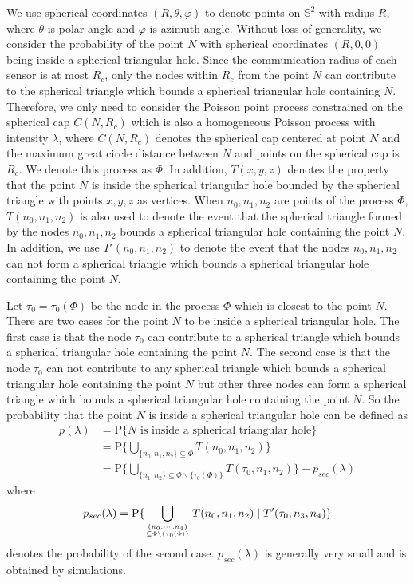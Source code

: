 \documentclass[journal, twoside]{IEEEtran}
\begin{document}
We use spherical coordinates $(R, \theta, \varphi)$ to denote points on $\mathbb{S}^2$ with radius $R$,
where $\theta$ is polar angle and $\varphi$ is azimuth angle. Without loss of generality, we
consider the probability of the point $N$ with spherical coordinates $(R, 0, 0)$ being inside a
spherical triangular hole. Since the communication radius of each sensor is 
at most $R_c$, only the nodes within $R_c$ from the point $N$ can
contribute to the spherical triangle which bounds a spherical triangular hole containing $N$. 
Therefore, we only need to consider the Poisson point
process constrained on the spherical cap $C(N, R_c)$ which is also a
homogeneous Poisson process with intensity $\lambda$, where $C(N, R_c)$
denotes the spherical cap centered at point $N$ and the maximum great circle
distance between $N$ and points on the spherical cap is $R_c$. We denote this
process as $\Phi$. In addition, $T(x, y, z)$ denotes the property that
the point $N$ is inside the spherical triangular hole
bounded by the spherical triangle with points $x, y, z$ as vertices. When $n_0, n_1,
n_2$ are points of the process $\Phi$, $T(n_0, n_1, n_2)$ is also used
to denote the event that the spherical triangle formed by the nodes $n_0,
n_1, n_2$ bounds a spherical triangular hole containing the point $N$. In addition,
we use $T'(n_0, n_1, n_2)$ to denote the event that the nodes
$n_0, n_1, n_2$ can not form a spherical triangle which bounds a spherical triangular hole 
containing the point $N$.

Let $\tau_0 = \tau_0(\Phi)$ be the node in the process $\Phi$ which is
closest to the point $N$. There are two cases for the point $N$ to be inside a
spherical triangular hole. The first case is that the node $\tau_0$ can contribute to
a spherical triangle which bounds a spherical triangular hole containing the point $N$. The
second case is that the node $\tau_0$ can not contribute to any spherical triangle
which bounds a spherical triangular hole containing the point $N$ but other three
nodes can form a spherical triangle which bounds a spherical triangular hole containing the 
point $N$. So the probability that the point $N$ is inside a spherical triangular hole 
can be defined as 
\begin{equation} \label{eqprob}
  \begin{split}
    p(\lambda) &= \mathrm{P}\{N \textrm{ is inside a spherical triangular hole}\} \\
    &= \mathrm{P}\{\bigcup_{\{n_0, n_1, n_2\} \subseteq \Phi} T(n_0, n_1, n_2)\} \\
    &= \mathrm{P}\{\bigcup_{\{n_1, n_2\} \subseteq \Phi
      \backslash \{\tau_0(\Phi)\}} T(\tau_0, n_1, n_2)\} + p_{sec}(\lambda) 
  \end{split}
\end{equation}
where 
\begin{displaymath}
    p_{sec}(\lambda) = \mathrm{P}\{\bigcup_{\{n_0,\cdots, n_4\} \atop \subseteq \Phi
            \backslash \{\tau_0(\Phi)\}} T(n_0, n_1, n_2)\mid T^\prime(\tau_0, n_3, n_4) \}
\end{displaymath}
\noindent denotes the probability of the second case. $p_{sec}(\lambda)$ is generally very
small and is obtained by simulations.
\end{document}
